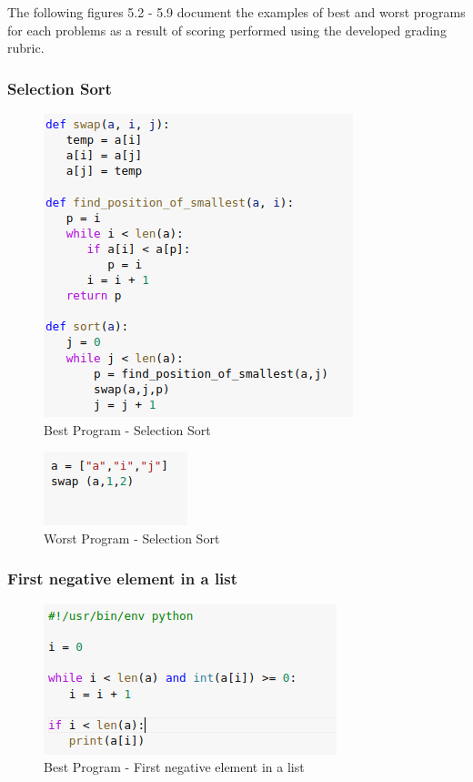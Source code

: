 The following figures 5.2 - 5.9 document the examples of best and worst programs for each problems as a result of scoring performed using the developed grading rubric. 

\subsubsection{Selection Sort}

\begin{figure}[h]
\centering
\includegraphics[]{./figures/best_ss.png}
\caption{Best Program - Selection Sort}
\label{fig1}
\end{figure}

\begin{figure}[h]
\centering
\includegraphics[]{./figures/worst_ss.png}
\caption{Worst Program - Selection Sort}
\label{fig1}
\end{figure}

\newpage


\subsubsection{First negative element in a list}

\begin{figure}[h]
\centering
\includegraphics[]{./figures/best_fn.png}
\caption{Best Program - First negative element in a list}
\label{fig1}
\end{figure}

